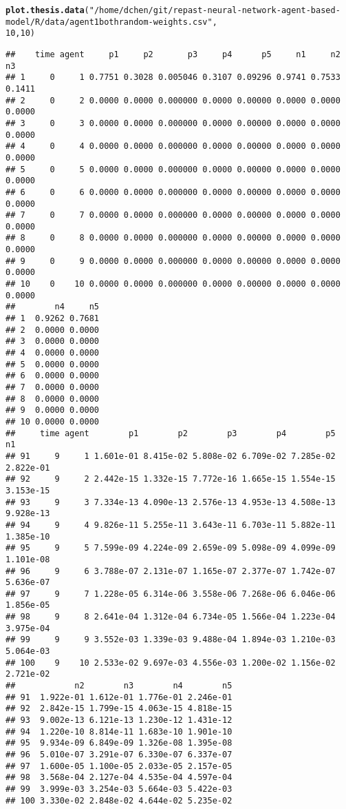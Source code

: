 \documentclass{article}\usepackage[]{graphicx}\usepackage[]{color}
\makeatletter
\newcommand{\hlnum}[1]{\textcolor[rgb]{0.686,0.059,0.569}{#1}}%
\newcommand{\hlstr}[1]{\textcolor[rgb]{0.192,0.494,0.8}{#1}}%
\newcommand{\hlstd}[1]{\textcolor[rgb]{0.345,0.345,0.345}{#1}}%
\newcommand{\hlkwd}[1]{\textcolor[rgb]{0.737,0.353,0.396}{\textbf{#1}}}%
\newenvironment{kframe}{%
 \def\at@end@of@kframe{}%
 \ifinner\ifhmode%
  \def\at@end@of@kframe{\end{minipage}}%
  \begin{minipage}{\columnwidth}%
 \fi\fi%
 \def\FrameCommand##1{\hskip\@totalleftmargin \hskip-\fboxsep
 \colorbox{shadecolor}{##1}\hskip-\fboxsep
     \hskip-\linewidth \hskip-\@totalleftmargin \hskip\columnwidth}%
 \MakeFramed {\advance\hsize-\width
   \@totalleftmargin\z@ \linewidth\hsize
   \@setminipage}}%
 {\par\unskip\endMakeFramed%
 \at@end@of@kframe}
\newenvironment{knitrout}{}{} %
\makeatother
\begin{document}
\begin{knitrout}
\color{fgcolor}\begin{kframe}
\begin{alltt}
\hlkwd{plot.thesis.data}\hlstd{(}\hlstr{"/home/dchen/git/repast-neural-network-agent-based-model/R/data/agent1bothrandom-weights.csv"}\hlstd{,}
    \hlnum{10}\hlstd{,} \hlnum{10}\hlstd{)}
\end{alltt}
\begin{verbatim}
##    time agent     p1     p2       p3     p4      p5     n1     n2     n3
## 1     0     1 0.7751 0.3028 0.005046 0.3107 0.09296 0.9741 0.7533 0.1411
## 2     0     2 0.0000 0.0000 0.000000 0.0000 0.00000 0.0000 0.0000 0.0000
## 3     0     3 0.0000 0.0000 0.000000 0.0000 0.00000 0.0000 0.0000 0.0000
## 4     0     4 0.0000 0.0000 0.000000 0.0000 0.00000 0.0000 0.0000 0.0000
## 5     0     5 0.0000 0.0000 0.000000 0.0000 0.00000 0.0000 0.0000 0.0000
## 6     0     6 0.0000 0.0000 0.000000 0.0000 0.00000 0.0000 0.0000 0.0000
## 7     0     7 0.0000 0.0000 0.000000 0.0000 0.00000 0.0000 0.0000 0.0000
## 8     0     8 0.0000 0.0000 0.000000 0.0000 0.00000 0.0000 0.0000 0.0000
## 9     0     9 0.0000 0.0000 0.000000 0.0000 0.00000 0.0000 0.0000 0.0000
## 10    0    10 0.0000 0.0000 0.000000 0.0000 0.00000 0.0000 0.0000 0.0000
##        n4     n5
## 1  0.9262 0.7681
## 2  0.0000 0.0000
## 3  0.0000 0.0000
## 4  0.0000 0.0000
## 5  0.0000 0.0000
## 6  0.0000 0.0000
## 7  0.0000 0.0000
## 8  0.0000 0.0000
## 9  0.0000 0.0000
## 10 0.0000 0.0000
##     time agent        p1        p2        p3        p4        p5        n1
## 91     9     1 1.601e-01 8.415e-02 5.808e-02 6.709e-02 7.285e-02 2.822e-01
## 92     9     2 2.442e-15 1.332e-15 7.772e-16 1.665e-15 1.554e-15 3.153e-15
## 93     9     3 7.334e-13 4.090e-13 2.576e-13 4.953e-13 4.508e-13 9.928e-13
## 94     9     4 9.826e-11 5.255e-11 3.643e-11 6.703e-11 5.882e-11 1.385e-10
## 95     9     5 7.599e-09 4.224e-09 2.659e-09 5.098e-09 4.099e-09 1.101e-08
## 96     9     6 3.788e-07 2.131e-07 1.165e-07 2.377e-07 1.742e-07 5.636e-07
## 97     9     7 1.228e-05 6.314e-06 3.558e-06 7.268e-06 6.046e-06 1.856e-05
## 98     9     8 2.641e-04 1.312e-04 6.734e-05 1.566e-04 1.223e-04 3.975e-04
## 99     9     9 3.552e-03 1.339e-03 9.488e-04 1.894e-03 1.210e-03 5.064e-03
## 100    9    10 2.533e-02 9.697e-03 4.556e-03 1.200e-02 1.156e-02 2.721e-02
##            n2        n3        n4        n5
## 91  1.922e-01 1.612e-01 1.776e-01 2.246e-01
## 92  2.842e-15 1.799e-15 4.063e-15 4.818e-15
## 93  9.002e-13 6.121e-13 1.230e-12 1.431e-12
## 94  1.220e-10 8.814e-11 1.683e-10 1.901e-10
## 95  9.934e-09 6.849e-09 1.326e-08 1.395e-08
## 96  5.010e-07 3.291e-07 6.330e-07 6.337e-07
## 97  1.600e-05 1.100e-05 2.033e-05 2.157e-05
## 98  3.568e-04 2.127e-04 4.535e-04 4.597e-04
## 99  3.999e-03 3.254e-03 5.664e-03 5.422e-03
## 100 3.330e-02 2.848e-02 4.644e-02 5.235e-02
\end{verbatim}
\end{kframe}\begin{figure}[]


\end{figure}
\end{knitrout}
\end{document}
